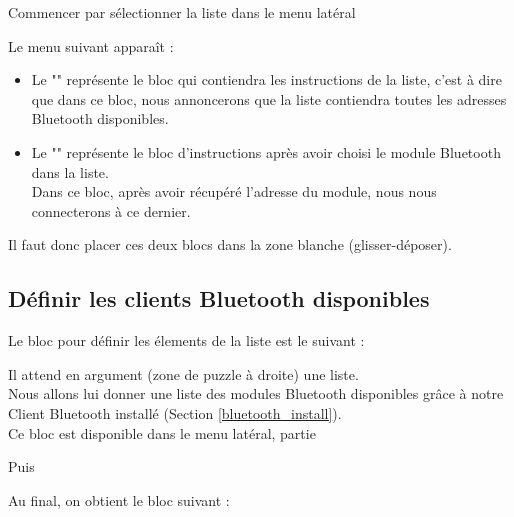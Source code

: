 Commencer par sélectionner la liste  dans le menu latéral


Le menu suivant apparaît : \\


\begin{itemize}
    \item Le "" représente le bloc qui contiendra les instructions de la liste, c'est à dire que dans ce bloc, nous annoncerons que la liste contiendra toutes les adresses Bluetooth disponibles.
    \item Le "" représente le bloc d'instructions après avoir choisi le module Bluetooth dans la liste. \\Dans ce bloc, après avoir récupéré l'adresse du module, nous nous connecterons à ce dernier.
\end{itemize}

Il faut donc placer ces deux blocs dans la zone blanche (glisser-déposer).

\subsection{Définir les clients Bluetooth disponibles}

Le bloc pour définir les élements de la liste  est le suivant : 


Il attend en argument (zone de puzzle à droite) une liste. \\
Nous allons lui donner une liste des modules Bluetooth disponibles grâce à notre Client Bluetooth installé (Section \ref{bluetooth_install}). \\

Ce bloc est disponible dans le menu latéral, partie 


Puis


Au final, on obtient le bloc suivant : 



